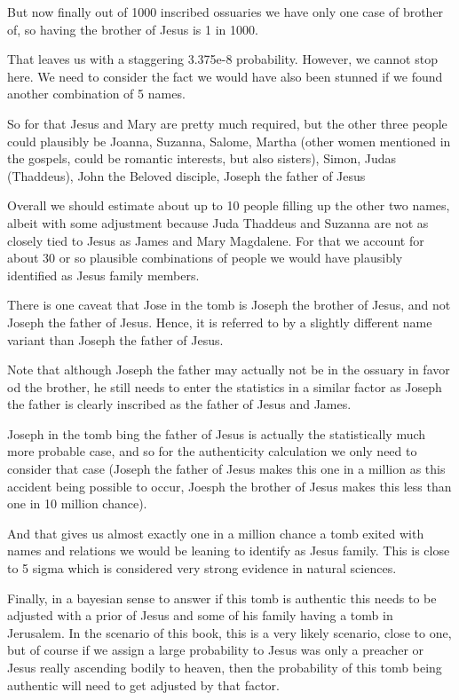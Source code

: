 But now finally out of 1000 inscribed ossuaries we have only one case of brother of, so having the brother of Jesus is 1 in 1000.

That leaves us with a staggering 3.375e-8 probability.
However, we cannot stop here.
We need to consider the fact we would have also been stunned if we found another combination of 5 names.

So for that Jesus and Mary are pretty much required, but the other three people could plausibly be Joanna, Suzanna, Salome, Martha (other women mentioned in the gospels, could be romantic interests, but also sisters), Simon, Judas (Thaddeus), John the Beloved disciple, Joseph the father of Jesus

Overall we should estimate about up to 10 people filling up the other two names, albeit with some adjustment because Juda Thaddeus and Suzanna are not as closely tied to Jesus as James and Mary Magdalene.
For that we account for about 30 or so plausible combinations of people we would have plausibly identified as Jesus family members.

There is one caveat that Jose in the tomb is Joseph the brother of Jesus, and not Joseph the father of Jesus.
Hence, it is referred to by a slightly different name variant than Joseph the father of Jesus.

Note that although Joseph the father may actually not be in the ossuary in favor od the brother, he still needs to enter the statistics in a similar factor as Joseph the father is clearly inscribed as the father of Jesus and James.

Joseph in the tomb bing the father of Jesus is actually the statistically much more probable case, and so for the authenticity calculation we only need to consider that case (Joseph the father of Jesus makes this one in a million as this accident being possible to occur, Joesph the brother of Jesus makes this less than one in 10 million chance).

And that gives us almost exactly one in a million chance a tomb exited with names and relations we would be leaning to identify as Jesus family.
This is close to 5 sigma which is considered very strong evidence in natural sciences.

Finally, in a bayesian sense to answer if this tomb is authentic this needs to be adjusted with a prior of Jesus and some of his family having a tomb in Jerusalem.
In the scenario of this book, this is a very likely scenario, close to one, but of course if we assign a large probability to Jesus was only a preacher or Jesus really ascending bodily to heaven, then the probability of this tomb being authentic will need to get adjusted by that factor.


